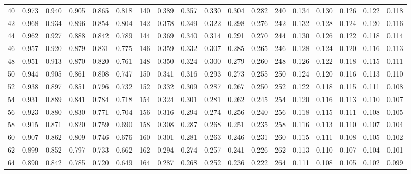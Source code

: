 \begin{table}[H]
\begin{tabular}{c|ccccc|c|ccccc|c|ccccc}
	    40      & 0.973 & 0.940 & 0.905 & 0.865 & 0.818 &     140     & 0.389 & 0.357 & 0.330 & 0.304 & 0.282 &     240     & 0.134 & 0.130 & 0.126 & 0.122 & 0.118 \\
	    42      & 0.968 & 0.934 & 0.896 & 0.854 & 0.804 &     142     & 0.378 & 0.349 & 0.322 & 0.298 & 0.276 &     242     & 0.132 & 0.128 & 0.124 & 0.120 & 0.116 \\
	    44      & 0.962 & 0.927 & 0.888 & 0.842 & 0.789 &     144     & 0.369 & 0.340 & 0.314 & 0.291 & 0.270 &     244     & 0.130 & 0.126 & 0.122 & 0.118 & 0.114 \\
	    46      & 0.957 & 0.920 & 0.879 & 0.831 & 0.775 &     146     & 0.359 & 0.332 & 0.307 & 0.285 & 0.265 &     246     & 0.128 & 0.124 & 0.120 & 0.116 & 0.113 \\
	    48      & 0.951 & 0.913 & 0.870 & 0.820 & 0.761 &     148     & 0.350 & 0.324 & 0.300 & 0.279 & 0.260 &     248     & 0.126 & 0.122 & 0.118 & 0.115 & 0.111 \\
	    50      & 0.944 & 0.905 & 0.861 & 0.808 & 0.747 &     150     & 0.341 & 0.316 & 0.293 & 0.273 & 0.255 &     250     & 0.124 & 0.120 & 0.116 & 0.113 & 0.110 \\
	    52      & 0.938 & 0.897 & 0.851 & 0.796 & 0.732 &     152     & 0.332 & 0.309 & 0.287 & 0.267 & 0.250 &     252     & 0.122 & 0.118 & 0.115 & 0.111 & 0.108 \\
	    54      & 0.931 & 0.889 & 0.841 & 0.784 & 0.718 &     154     & 0.324 & 0.301 & 0.281 & 0.262 & 0.245 &     254     & 0.120 & 0.116 & 0.113 & 0.110 & 0.107 \\
	    56      & 0.923 & 0.880 & 0.830 & 0.771 & 0.704 &     156     & 0.316 & 0.294 & 0.274 & 0.256 & 0.240 &     256     & 0.118 & 0.115 & 0.111 & 0.108 & 0.105 \\
	    58      & 0.915 & 0.871 & 0.820 & 0.759 & 0.690 &     158     & 0.308 & 0.287 & 0.268 & 0.251 & 0.235 &     258     & 0.116 & 0.113 & 0.110 & 0.107 & 0.104 \\
	    60      & 0.907 & 0.862 & 0.809 & 0.746 & 0.676 &     160     & 0.301 & 0.281 & 0.263 & 0.246 & 0.231 &     260     & 0.115 & 0.111 & 0.108 & 0.105 & 0.102 \\
	    62      & 0.899 & 0.852 & 0.797 & 0.733 & 0.662 &     162     & 0.294 & 0.274 & 0.257 & 0.241 & 0.226 &     262     & 0.113 & 0.110 & 0.107 & 0.104 & 0.101 \\
	    64      & 0.890 & 0.842 & 0.785 & 0.720 & 0.649 &     164     & 0.287 & 0.268 & 0.252 & 0.236 & 0.222 &     264     & 0.111 & 0.108 & 0.105 & 0.102 & 0.099 \\

\end{tabular}
\end{table}
